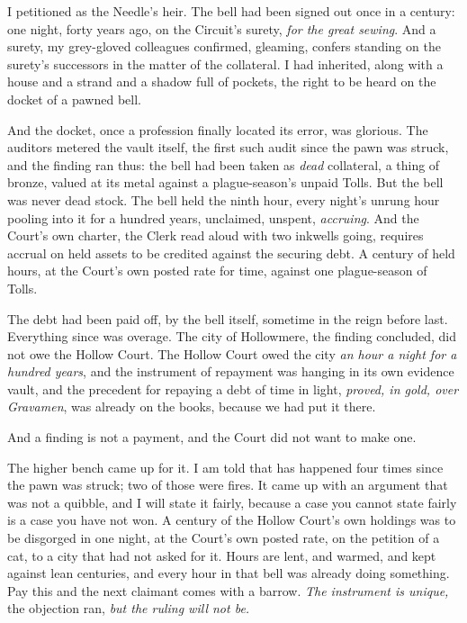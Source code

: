 I petitioned as the Needle's heir. The bell had been signed out once in a century: one night, forty years ago, on the Circuit's surety, \emph{for the great sewing}. And a surety, my grey-gloved colleagues confirmed, gleaming, confers standing on the surety's successors in the matter of the collateral. I had inherited, along with a house and a strand and a shadow full of pockets, the right to be heard on the docket of a pawned bell.

And the docket, once a profession finally located its error, was glorious. The auditors metered the vault itself, the first such audit since the pawn was struck, and the finding ran thus: the bell had been taken as \emph{dead} collateral, a thing of bronze, valued at its metal against a plague-season's unpaid Tolls. But the bell was never dead stock. The bell held the ninth hour, every night's unrung hour pooling into it for a hundred years, unclaimed, unspent, \emph{accruing}. And the Court's own charter, the Clerk read aloud with two inkwells going, requires accrual on held assets to be credited against the securing debt. A century of held hours, at the Court's own posted rate for time, against one plague-season of Tolls.

The debt had been paid off, by the bell itself, sometime in the reign before last. Everything since was overage. The city of Hollowmere, the finding concluded, did not owe the Hollow Court. The Hollow Court owed the city \emph{an hour a night for a hundred years}, and the instrument of repayment was hanging in its own evidence vault, and the precedent for repaying a debt of time in light, \emph{proved, in gold, over Gravamen}, was already on the books, because we had put it there.

And a finding is not a payment, and the Court did not want to make one.

The higher bench came up for it. I am told that has happened four times since the pawn was struck; two of those were fires. It came up with an argument that was not a quibble, and I will state it fairly, because a case you cannot state fairly is a case you have not won. A century of the Hollow Court's own holdings was to be disgorged in one night, at the Court's own posted rate, on the petition of a cat, to a city that had not asked for it. Hours are lent, and warmed, and kept against lean centuries, and every hour in that bell was already doing something. Pay this and the next claimant comes with a barrow. \emph{The instrument is unique,} the objection ran, \emph{but the ruling will not be.}

